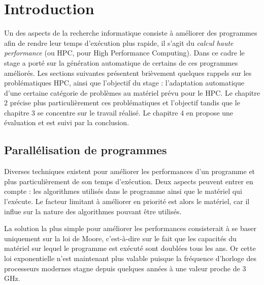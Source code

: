 
\chapter{Introduction}

Un des aspects de la recherche informatique consiste à améliorer des programmes afin de rendre leur temps d'exécution plus rapide, il s'agit du \emph{calcul haute performance} (ou HPC, pour High Performance Computing). 
Dans ce cadre le stage a porté sur la génération automatique de certains de ces programmes améliorés. 
Les sections suivantes présentent brièvement quelques rappels sur les problématiques HPC, ainsi que l'objectif du stage : l'adaptation automatique d'une certaine catégorie de problèmes au matériel prévu pour le HPC. Le chapitre $2$ précise plus particulièrement ces problématiques et l'objectif tandis que le chapitre $3$ se concentre sur le travail réalisé. Le chapitre $4$ en propose une évaluation et est suivi par la conclusion. 


\section{Parallélisation de programmes}

Diverses techniques existent pour améliorer les performances d'un programme et plus particulièrement de son temps d'exécution. Deux aspects peuvent entrer en compte : les algorithmes utilisés dans le programme ainsi que le matériel qui l'exécute. Le facteur limitant à améliorer en priorité est alors le matériel, car il influe sur la nature des algorithmes pouvant être utilisés.

La solution la plus simple pour améliorer les performances consisterait à se baser uniquement sur la loi de Moore, c'est-à-dire sur le fait que les capacités du matériel sur lequel le programme est exécuté sont doublées tous les ans. Or cette loi exponentielle n'est maintenant plus valable puisque la fréquence d'horloge des processeurs modernes stagne depuis quelques années à une valeur proche de $3$ GHz. 

